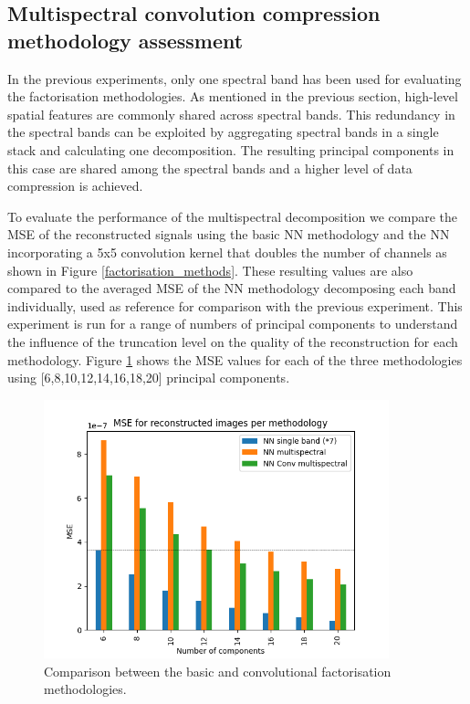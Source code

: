 \documentclass[essd, manuscript]{copernicus}
\begin{document}
\subsection{Multispectral convolution compression methodology assessment}
In the previous experiments, only one spectral band has been used for evaluating the factorisation methodologies. As mentioned in the previous section, high-level spatial features are commonly shared across spectral bands. This redundancy in the spectral bands can be exploited by aggregating spectral bands in a single stack and calculating one decomposition. The resulting principal components in this case are shared among the spectral bands and a higher level of data compression is achieved.

To evaluate the performance of the multispectral decomposition we compare the MSE of the reconstructed signals using the basic NN methodology and the NN incorporating a 5x5 convolution kernel that doubles the number of channels as shown in Figure \ref{factorisation_methods}. These resulting values are also compared to the averaged MSE of the NN methodology decomposing each band individually, used as reference for comparison with the previous experiment. This experiment is run for a range of numbers of principal components to understand the influence of the truncation level on the quality of the reconstruction for each methodology. Figure \ref{compression_cmp} shows the MSE values for each of the three methodologies using [6,8,10,12,14,16,18,20] principal components.

\begin{figure}
    \includegraphics[width=10cm]{fig8.png}
    \caption{Comparison between the basic and convolutional factorisation methodologies.}%
    \label{compression_cmp}%
\end{figure}
\end{document}
